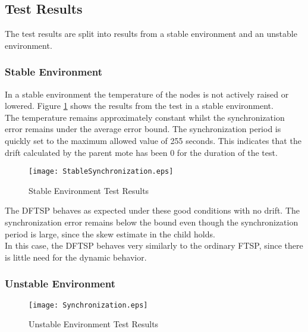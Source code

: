 \documentclass[Main]{subfiles}
\begin{document}
	

	\subsection{Test Results} %
	\label{sub:test_results}
		The test results are split into results from a stable environment and an unstable environment.  


		\subsubsection{Stable Environment} %
		\label{sub:stable_environment}
			
			In a stable environment the temperature of the nodes is not actively raised or lowered.
			Figure \ref{fig:stableSynchronization} shows the results from the test in a stable environment.
			\\The temperature remains approximately constant whilst the synchronization error remains under the average error bound.
			The synchronization period is quickly set to the maximum allowed value of 255 seconds. This indicates that the drift calculated by the parent mote has been 0 for the duration of the test.   

			\begin{figure}[H]
				\centering
				\texttt{[image: StableSynchronization.eps]}
				\caption{Stable Environment Test Results}
				\label{fig:stableSynchronization}
			\end{figure}

			The DFTSP behaves as expected under these good conditions with no drift. 
			The synchronization error remains below the bound even though the synchronization period is large, since the skew estimate in the child holds.
			\\ In this case, the DFTSP behaves very similarly to the ordinary FTSP, since there is little need for the dynamic behavior. 



		\subsubsection{Unstable Environment} %
		\label{sub:unstable_environment}
			
			\begin{figure}[H]
				\centering
				\texttt{[image: Synchronization.eps]}
				\caption{Unstable Environment Test Results}
				\label{fig:unstableSynchronization}
			\end{figure}

	

\end{document}
